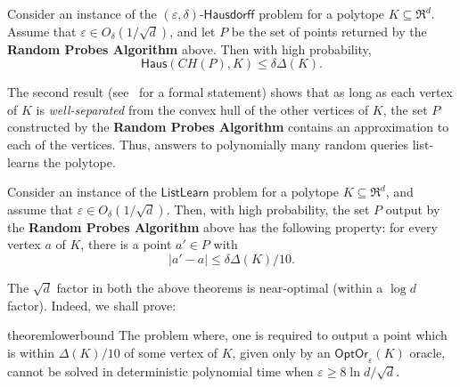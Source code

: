 \documentclass[11pt,letterpaper]{article}
\newcommand{\Haus}{{\mathsf{Haus}}}
\newcommand{\ListLearn}{\mathsf {ListLearn}\xspace}
\newcommand{\Hausdorf}{\mathsf {Hausdorff}\xspace }
\newcommand{\opto}{{\mathsf{OptOr}}}
\begin{document}
\begin{theorem} 
\label{hausdorf-0}
Consider an instance of the $(\varepsilon, \delta)$-$\Hausdorf$ problem for a polytope $K \subseteq \Re^d$. Assume  that
$\varepsilon\in O_\delta(1/\sqrt d)$, and let $P$ be the set of points returned by the {\bf Random Probes Algorithm} above. 
Then with high probability, 
$$ \Haus(CH(P),K)\leq \delta\Delta(K).$$
\end{theorem}

The second result (see~ for a formal statement) shows that as long as each vertex of $K$ is {\em well-separated} from the convex hull of the other vertices of $K$, the set $P$ constructed by the {\bf Random Probes Algorithm} contains an approximation to each of the vertices. Thus, answers to polynomially many random queries list-learns the polytope.  


\begin{theorem}\label{list-0}
Consider an instance of  the $\ListLearn$ problem for a polytope $K \subseteq \Re^d$, and assume that  
  $\varepsilon\in O_\delta(1/\sqrt d)$. Then, with high probability, the set $P$ output by the {\bf Random Probes  Algorithm} above has the following property:
for every vertex $a$ of $K$, there is a point $a'\in P$ with
$$|a'-a|\leq \delta\Delta(K)/10.$$
\end{theorem}

The $\sqrt d$ factor in both the above theorems is near-optimal (within a $\log d$ factor). Indeed, we shall prove:

\begin{restatable}{theorem}{lowerbound}
\label{lower-bound-0}
The problem where, one is required to output a point which is within $\Delta (K)/10$ of some vertex of $K$, given only by an $\opto_\varepsilon(K)$ oracle,  cannot be solved in deterministic polynomial time when $\varepsilon\geq 8\ln d/\sqrt d$.
\end{restatable}
\end{document}
